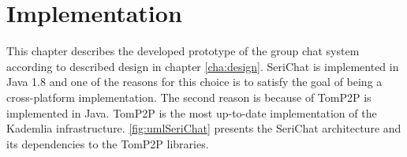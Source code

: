 \chapter{Implementation} \label{cha:implementation}
%
%
This chapter describes the developed prototype of the group chat system according to described design in chapter \ref{cha:design}.
SeriChat is implemented in Java 1.8 and one of the reasons for this choice is to satisfy the goal of being a cross-platform implementation. The second reason is because of TomP2P is implemented in Java. TomP2P is the most up-to-date implementation of the Kademlia infrastructure. \autoref{fig:umlSeriChat} presents the SeriChat architecture and its dependencies to the TomP2P libraries.

